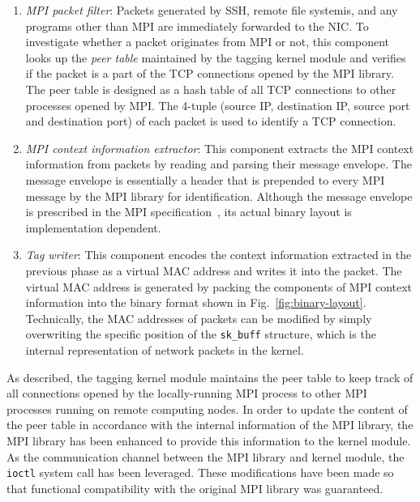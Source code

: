 \begin{enumerate}
\def\labelenumi{\arabic{enumi}.}
\item
  \emph{MPI packet filter}: Packets generated by SSH, remote file
  systemis, and any programs other than MPI are immediately forwarded to
  the NIC\@. To investigate whether a packet originates from MPI or not,
  this component looks up the \emph{peer table} maintained by the
  tagging kernel module and verifies if the packet is a part of the TCP
  connections opened by the MPI library. The peer table is designed as a
  hash table of all TCP connections to other processes opened by MPI\@.
  The 4-tuple (source IP, destination IP, source port and destination
  port) of each packet is used to identify a TCP connection.
\item
  \emph{MPI context information extractor}: This component extracts the
  MPI context information from packets by reading and parsing their
  message envelope. The message envelope is essentially a header that is
  prepended to every MPI message by the MPI library for identification.
  Although the message envelope is prescribed in the MPI
  specification~\autocite{MPIForum2012}, its actual binary layout is
  implementation dependent.
\item
  \emph{Tag writer}: This component encodes the context information
  extracted in the previous phase as a virtual MAC address and writes it
  into the packet. The virtual MAC address is generated by packing the
  components of MPI context information into the binary format shown in
  Fig.~\ref{fig:binary-layout}. Technically, the MAC addresses of
  packets can be modified by simply overwriting the specific position of
  the \lstinline!sk_buff! structure, which is the
  internal representation of network packets in the kernel.
\end{enumerate}

As described, the tagging kernel module maintains the peer table to keep
track of all connections opened by the locally-running MPI process to
other MPI processes running on remote computing nodes. In order to
update the content of the peer table in accordance with the internal
information of the MPI library, the MPI library has been enhanced to
provide this information to the kernel module. As the communication
channel between the MPI library and kernel module, the
\lstinline!ioctl! system call has been leveraged. These
modifications have been made so that functional compatibility with the
original MPI library was guaranteed.

